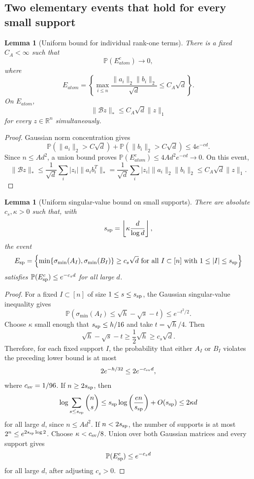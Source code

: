 \documentclass[11pt]{article}
\numberwithin{equation}{section}
\newtheorem{lemma}[theorem]{Lemma}
\theoremstyle{definition}
\theoremstyle{remark}
\newcommand{\Pp}{\mathbb P}
\newcommand{\1}{\boldsymbol 1}
\begin{document}
\begin{aiblock}
\subsection{Two elementary events that hold for
  every small support}\label{two-uniform-elementary-events}

\begin{lemma}[Uniform bound for individual rank-one
  terms]\label{record-lemma-3-1}
  There is a fixed $C_A<\infty$ such that
  \[
    \Pp(E_{atom}^c)\to0,
  \]
  where
  \[
    E_{atom}=\left\{\max_{i\le n}\frac{\|a_i\|_2\|b_i\|_2}
    {\sqrt d}\le C_A\sqrt d\right\}.
  \]
  On $E_{atom}$,
  \[
    \|\mathcal{B}z\|_*\le C_A\sqrt d\|z\|_1
  \]
  for every $z\in{\mathbb R}^n$ simultaneously.
\end{lemma}

\begin{proof}
  Gaussian norm concentration gives
  \[
    \Pp(\|a_i\|_2>C\sqrt d)+\Pp(\|b_i\|_2>C\sqrt
    d)\le4e^{-cd}.
  \]
  Since $n\le Ad^2$, a union bound proves
  $\Pp(E_{atom}^c)\le4Ad^2e^{-cd}\to0$. On this event,
  \[
    \|\mathcal{B}z\|_* \le \frac1{\sqrt d}\sum_i|z_i|
    \|a_i b_i^T\|_* = \frac1{\sqrt d}\sum_i|z_i|
    \|a_i\|_2\|b_i\|_2 \le C_A\sqrt d\|z\|_1.
  \]
\end{proof}

\begin{lemma}[Uniform singular-value bound on small
  supports]\label{record-lemma-3-2}
  There are absolute $c_s,\kappa>0$ such that, with
  \[
    s_{\rm sp}=\left\lfloor\kappa\frac{d}{\log d}
    \right\rfloor,
  \]
  the event
  \[
    E_{\rm sp}=\left\{\min\{\sigma_{\min}(A_I),
    \sigma_{\min}(B_I)\}\ge c_s\sqrt d\text{ for
    all }I\subset[n]\text{ with }1\le|I|\le
    s_{\rm sp}\right\}
  \]
  satisfies $\Pp(E_{\rm sp}^c)\le e^{-c_sd}$ for all
  large $d$.
\end{lemma}

\begin{proof}
  For a fixed $I\subset[n]$ of size $1\le s\le
  s_{\rm sp}$, the Gaussian singular-value inequality
  \cite[Theorem II.13]{DavidsonSzarek2001} gives
  \[
    \Pp(\sigma_{\min}(A_I)\le\sqrt h-\sqrt s-t)
    \le e^{-t^2/2}.
  \]
  Choose $\kappa$ small enough that
  $s_{\rm sp}\le h/16$ and take $t=\sqrt h/4$. Then
  \[
    \sqrt h-\sqrt s-t\ge\frac12\sqrt h\ge c_s\sqrt d.
  \]
  Therefore, for each fixed support $I$, the
  probability that either $A_I$ or $B_I$ violates the
  preceding lower bound is at most
  \[
    2e^{-h/32}\le2e^{-c_{\rm sv}d},
  \]
  where $c_{\rm sv}=1/96$. If $n\ge2s_{\rm sp}$, then
  \[
    \log\sum_{s\le s_{\rm sp}}\binom ns\le
    s_{\rm sp}\log\left(\frac{en}{s_{\rm sp}}\right)
    +O(s_{\rm sp})\le2\kappa d
  \]
  for all large $d$, since $n\le Ad^2$. If
  $n<2s_{\rm sp}$, the number of supports is at most
  $2^n\le e^{2s_{\rm sp}\log2}$. Choose
  $\kappa<c_{\rm sv}/8$. Union over both Gaussian
  matrices and every support gives
  \[
    \Pp(E_{\rm sp}^c)\le e^{-c_sd}
  \]
  for all large $d$, after adjusting $c_s>0$.
\end{proof}


\end{aiblock}
\end{document}
